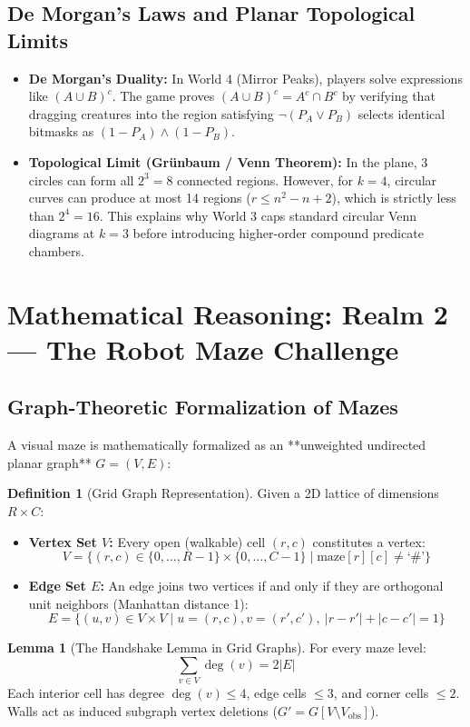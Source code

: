 \documentclass[11pt,a4paper]{article}
\theoremstyle{definition}
\newtheorem{lemma}{Lemma}
\newtheorem{definition}{Definition}
\begin{document}
\subsection{De Morgan's Laws and Planar Topological Limits}
\begin{itemize}
  \item \textbf{De Morgan's Duality:} In World 4 (Mirror Peaks), players solve expressions like $(A \cup B)^c$. The game proves $(A \cup B)^c = A^c \cap B^c$ by verifying that dragging creatures into the region satisfying $\neg(P_A \lor P_B)$ selects identical bitmasks as $(1 - P_A) \land (1 - P_B)$.
  \item \textbf{Topological Limit (Grünbaum / Venn Theorem):} In the plane, 3 circles can form all $2^3 = 8$ connected regions. However, for $k = 4$, circular curves can produce at most 14 regions ($r \le n^2 - n + 2$), which is strictly less than $2^4 = 16$. This explains why World 3 caps standard circular Venn diagrams at $k=3$ before introducing higher-order compound predicate chambers.
\end{itemize}

\newpage
\section{Mathematical Reasoning: Realm 2 --- The Robot Maze Challenge}

\subsection{Graph-Theoretic Formalization of Mazes}
A visual maze is mathematically formalized as an **unweighted undirected planar graph** $G = (V, E)$:
\begin{definition}[Grid Graph Representation]
Given a 2D lattice of dimensions $R \times C$:
\begin{itemize}
  \item \textbf{Vertex Set $V$:} Every open (walkable) cell $(r, c)$ constitutes a vertex:
  $$V = \{(r, c) \in \{0, \dots, R-1\} \times \{0, \dots, C-1\} \mid \text{maze}[r][c] \neq \text{`\#'}\}$$
  \item \textbf{Edge Set $E$:} An edge joins two vertices if and only if they are orthogonal unit neighbors (Manhattan distance 1):
  $$E = \{(u, v) \in V \times V \mid u = (r, c), v = (r', c'), \ |r - r'| + |c - c'| = 1\}$$
\end{itemize}
\end{definition}

\begin{lemma}[The Handshake Lemma in Grid Graphs]
For every maze level:
$$\sum_{v \in V} \operatorname{deg}(v) = 2|E|$$
Each interior cell has degree $\operatorname{deg}(v) \le 4$, edge cells $\le 3$, and corner cells $\le 2$. Walls act as induced subgraph vertex deletions ($G' = G[V \setminus V_{\text{obs}}]$).
\end{lemma}
\end{document}
